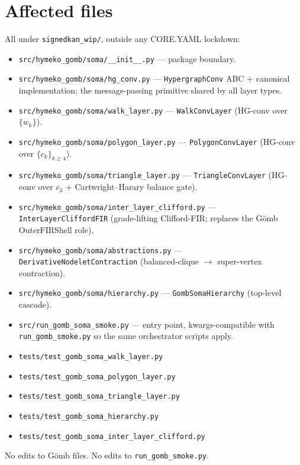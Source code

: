 \documentclass[11pt,a4paper]{article}
\newcommand{\Gomb}{G\"omb}
\begin{document}
\section{Affected files}

All under \texttt{signedkan\_wip/}, outside any CORE.YAML lockdown:

\begin{itemize}
\item \texttt{src/hymeko\_gomb/soma/\_\_init\_\_.py} --- package boundary.
\item \texttt{src/hymeko\_gomb/soma/hg\_conv.py} --- \texttt{HypergraphConv} ABC + canonical implementation; the message-passing primitive shared by all layer types.
\item \texttt{src/hymeko\_gomb/soma/walk\_layer.py} --- \texttt{WalkConvLayer} (HG-conv over $\{w_k\}$).
\item \texttt{src/hymeko\_gomb/soma/polygon\_layer.py} --- \texttt{PolygonConvLayer} (HG-conv over $\{c_k\}_{k \geq 4}$).
\item \texttt{src/hymeko\_gomb/soma/triangle\_layer.py} --- \texttt{TriangleConvLayer} (HG-conv over $c_3$ + Cartwright--Harary balance gate).
\item \texttt{src/hymeko\_gomb/soma/inter\_layer\_clifford.py} --- \texttt{InterLayerCliffordFIR} (grade-lifting Clifford-FIR; replaces the \Gomb{} OuterFIRShell role).
\item \texttt{src/hymeko\_gomb/soma/abstractions.py} --- \texttt{DerivativeNodeletContraction} (balanced-clique $\to$ super-vertex contraction).
\item \texttt{src/hymeko\_gomb/soma/hierarchy.py} --- \texttt{GombSomaHierarchy} (top-level cascade).
\item \texttt{src/run\_gomb\_soma\_smoke.py} --- entry point, kwargs-compatible with \texttt{run\_gomb\_smoke.py} so the same orchestrator scripts apply.
\item \texttt{tests/test\_gomb\_soma\_walk\_layer.py}
\item \texttt{tests/test\_gomb\_soma\_polygon\_layer.py}
\item \texttt{tests/test\_gomb\_soma\_triangle\_layer.py}
\item \texttt{tests/test\_gomb\_soma\_hierarchy.py}
\item \texttt{tests/test\_gomb\_soma\_inter\_layer\_clifford.py}
\end{itemize}

No edits to \Gomb{} files. No edits to \texttt{run\_gomb\_smoke.py}.
\end{document}
